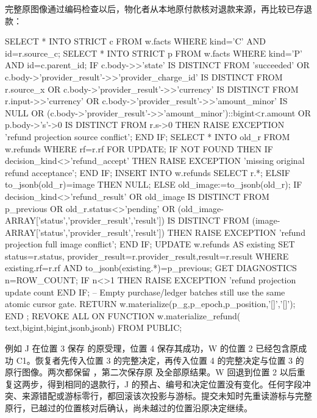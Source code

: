 完整原图像通过编码检查以后，物化者从本地原付款核对退款来源，再比较已存退款：

\begin{BookCode}
 SELECT * INTO STRICT c FROM w.facts
  WHERE kind='C' AND id=r.source_c;
 SELECT * INTO STRICT p FROM w.facts
  WHERE kind='P' AND id=c.parent_id;
 IF c.body->>'state' IS DISTINCT FROM 'succeeded'
    OR c.body->'provider_result'->>'provider_charge_id'
       IS DISTINCT FROM r.source_x
    OR c.body->'provider_result'->>'currency'
       IS DISTINCT FROM r.input->>'currency'
    OR c.body->'provider_result'->>'amount_minor' IS NULL
    OR (c.body->'provider_result'->>'amount_minor')::bigint<r.amount
    OR p.body->'s'->0 IS DISTINCT FROM r.s->0 THEN
   RAISE EXCEPTION 'refund projection source conflict';
 END IF;
 SELECT * INTO old_r FROM w.refunds WHERE rf=r.rf FOR UPDATE;
 IF NOT FOUND THEN
   IF decision_kind<>'refund_accept' THEN
     RAISE EXCEPTION 'missing original refund acceptance';
   END IF;
   INSERT INTO w.refunds SELECT r.*;
 ELSIF to_jsonb(old_r)=image THEN
   NULL;
 ELSE
   old_image:=to_jsonb(old_r);
   IF decision_kind<>'refund_result'
      OR old_image IS DISTINCT FROM p_previous
      OR old_r.status<>'pending'
      OR (old_image-ARRAY['status','provider_result','result'])
         IS DISTINCT FROM (image-ARRAY['status','provider_result','result']) THEN
     RAISE EXCEPTION 'refund projection full image conflict';
   END IF;
   UPDATE w.refunds AS existing SET status=r.status,
     provider_result=r.provider_result,result=r.result
    WHERE existing.rf=r.rf AND to_jsonb(existing.*)=p_previous;
   GET DIAGNOSTICS n=ROW_COUNT;
   IF n<>1 THEN RAISE EXCEPTION 'refund projection update count %
 END IF;
 -- Empty purchase/ledger batches still use the same atomic cursor gate.
 RETURN w.materialize(p_g,p_epoch,p_position,'[]','[]');
END $$;
REVOKE ALL ON FUNCTION w.materialize_refund(
 text,bigint,bigint,jsonb,jsonb) FROM PUBLIC;
\end{BookCode}

例如 J 在位置 3 保存  的原受理，位置 4 保存其成功，W 的位置 2 已经包含原成功 C1。恢复者先传入位置 3 的完整决定，再传入位置 4 的完整决定与位置 3 的原行图像。两次都保留 ，第二次保存原  及全部原结果。W 回退到位置 2 以后重复这两步，得到相同的退款行，J 的预占、编号和决定位置没有变化。任何字段冲突、来源错配或游标零行，都回滚该次投影与游标。提交未知时先重读游标与完整原行，已越过的位置核对后确认，尚未越过的位置沿原决定继续。
